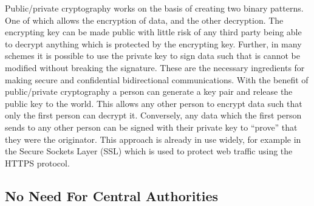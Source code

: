 \documentclass[british,english]{article}
\begin{document}
Public/private cryptography works on the basis of creating two binary
patterns. One of which allows the encryption of data, and the other
decryption. The encrypting key can be made public with little risk
of any third party being able to decrypt anything which is protected
by the encrypting key. Further, in many schemes it is possible to
use the private key to sign data such that is cannot be modified without
breaking the signature. These are the necessary ingredients for making
secure and confidential bidirectional communications. With the benefit
of public/private cryptography a person can generate a key pair and
release the public key to the world. This allows any other person
to encrypt data such that only the first person can decrypt it. Conversely,
any data which the first person sends to any other person can be signed
with their private key to {}``prove'' that they were the originator.
This approach is already in use widely, for example in the Secure
Sockets Layer (SSL\citep{ssl}) which is used to protect web traffic
using the HTTPS\citep{https} protocol. 


\subsection{No Need For Central Authorities}
\end{document}
